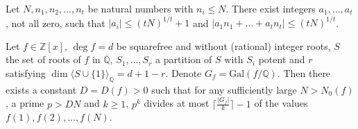 \documentclass[10pt,a4paper]{amsart}
\newcommand{\Gal}{{\mathrm{Gal}}}
\newcommand{\Qb}{{\overline{\Q}}}
\newcommand{\Q}{{\mathbb Q}}
\newcommand{\Z}{{\mathbb Z}}
\begin{document}
\begin{lem}\label{lem: int comb} Let $N,n_1,n_2,\ldots,n_t$ be natural numbers with $n_i\le N$. There exist integers $a_1,\ldots,a_t$, not all zero, such that $|a_i|\le (tN)^{1/t}+1$ and $|a_1n_1+\ldots+a_tn_t|\le (tN)^{1/t}$.\end{lem}

\begin{lem}\label{lem: pre lem main2} Let $f\in\Z[x],\,\deg f=d$ be squarefree and without (rational) integer roots, $S$ the set of roots of $f$ in $\Qb$, $S_1,\ldots,S_r$ a partition of $S$ with $S_i$ potent and $r$ satisfying $\dim\langle S\cup\{1\}\rangle_\Q=d+1-r$. Denote $G_f=\Gal(f/\Q)$.
Then there exists a constant $D=D(f)>0$ such that for any sufficiently large $N> N_0(f)$, a prime $p>DN$ and $k\ge 1$, $p^k$ divides at most
$\big\lceil\frac{|G_f|}k\big\rceil-1$ of the values $f(1),f(2),\ldots,f(N)$.
\end{lem}
\end{document}
